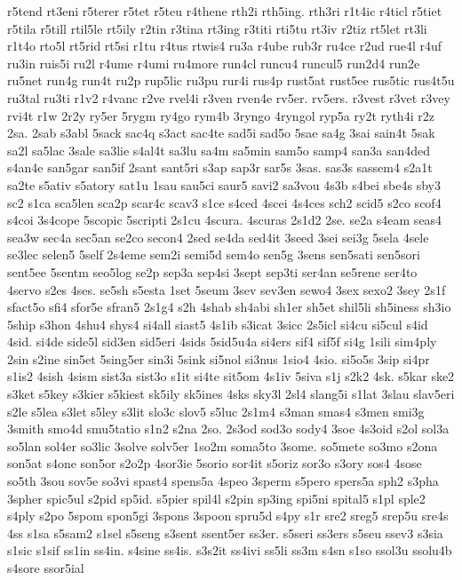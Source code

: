 {r5tend
rt3eni
r5terer
r5tet
r5teu
r4thene
rth2i
rth5ing.
rth3ri
r1t4ic
r4ticl
r5tiet
r5tila
r5till
rtil5le
rt5ily
r2tin
r3tina
rt3ing
r3titi
rti5tu
rt3iv
r2tiz
rt5let
rt3li
r1t4o
rto5l
rt5rid
rt5si
r1tu
r4tus
rtwis4
ru3a
r4ube
rub3r
ru4ce
r2ud
rue4l
r4uf
ru3in
ruis5i
ru2l
r4ume
r4umi
ru4more
run4cl
runcu4
runcul5
run2d4
run2e
ru5net
run4g
run4t
ru2p
rup5lic
ru3pu
rur4i
rus4p
rust5at
rust5ee
rus5tic
rus4t5u
ru3tal
ru3ti
r1v2
r4vanc
r2ve
rvel4i
r3ven
rven4e
rv5er.
rv5ers.
r3vest
r3vet
r3vey
rvi4t
r1w
2r2y
ry5er
5rygm
ry4go
rym4b
3ryngo
4ryngol
ryp5a
ry2t
ryth4i
r2z
2sa.
2sab
s3abl
5sack
sac4q
s3act
sac4te
sad5i
sad5o
5sae
sa4g
3sai
sain4t
5sak
sa2l
sa5lac
3sale
sa3lie
s4al4t
sa3lu
sa4m
sa5min
sam5o
samp4
san3a
san4ded
s4an4e
san5gar
san5if
2sant
sant5ri
s3ap
sap3r
sar5s
3sas.
sas3s
sassem4
s2a1t
sa2te
s5ativ
s5atory
sat1u
1sau
sau5ci
saur5
savi2
sa3vou
4s3b
s4bei
sbe4s
sby3
sc2
s1ca
sca5len
sca2p
scar4c
scav3
s1ce
s4ced
4scei
4s4ces
sch2
scid5
s2co
scof4
s4coi
3s4cope
5scopic
5scripti
2s1cu
4scura.
4scuras
2s1d2
2se.
se2a
s4eam
seas4
sea3w
sec4a
sec5an
se2co
secon4
2sed
se4da
sed4it
3seed
3sei
sei3g
5sela
4sele
se3lec
selen5
5self
2s4eme
sem2i
semi5d
sem4o
sen5g
3sens
sen5sati
sen5sori
sent5ee
5sentm
seo5log
se2p
sep3a
sep4si
3sept
sep3ti
ser4an
se5rene
ser4to
4servo
s2es
4ses.
se5sh
s5esta
1set
5seum
3sev
sev3en
sewo4
3sex
sexo2
3sey
2s1f
sfact5o
sfi4
sfor5e
sfran5
2s1g4
s2h
4shab
sh4abi
sh1er
sh5et
shil5li
sh5iness
sh3io
5ship
s3hon
4shu4
shys4
si4all
siast5
4s1ib
s3icat
3sicc
2s5icl
si4cu
si5cul
s4id
4sid.
si4de
side5l
sid3en
sid5eri
4sids
5sid5u4a
si4ers
sif4
sif5f
si4g
1sili
sim4ply
2sin
s2ine
sin5et
5sing5er
sin3i
5sink
si5nol
si3nus
1sio4
4sio.
si5o5s
3sip
si4pr
s1is2
4sish
4sism
sist3a
sist3o
s1it
si4te
sit5om
4s1iv
5siva
s1j
s2k2
4sk.
s5kar
ske2
s3ket
s5key
s3kier
s5kiest
sk5ily
sk5ines
4sks
sky3l
2sl4
slang5i
s1lat
3slau
slav5eri
s2le
s5lea
s3let
s5ley
s3lit
slo3c
slov5
s5luc
2s1m4
s3man
smas4
s3men
smi3g
3smith
smo4d
smu5tatio
s1n2
s2na
2so.
2s3od
sod3o
sody4
3soe
4s3oid
s2ol
sol3a
so5lan
sol4er
so3lic
3solve
solv5er
1so2m
soma5to
3some.
so5mete
so3mo
s2ona
son5at
s4one
son5or
s2o2p
4sor3ie
5sorio
sor4it
s5oriz
sor3o
s3ory
sos4
4sose
so5th
3sou
sov5e
so3vi
spast4
spens5a
4speo
3sperm
s5pero
spers5a
sph2
s3pha
3spher
spic5ul
s2pid
sp5id.
s5pier
spil4l
s2pin
sp3ing
spi5ni
spital5
s1pl
sple2
s4ply
s2po
5spom
spon5gi
3spons
3spoon
spru5d
s4py
s1r
sre2
sreg5
srep5u
sre4s
4ss
s1sa
s5sam2
s1sel
s5seng
s3sent
ssent5er
ss3er.
s5seri
ss3ers
s5seu
ssev3
s3sia
s1sic
s1sif
ss1in
ss4in.
s4sine
ss4is.
s3s2it
ss4ivi
ss5li
ss3m
s4sn
s1so
ssol3u
ssolu4b
s4sore
ssor5ial
}
